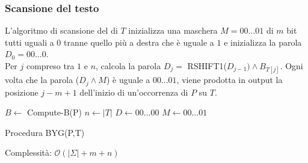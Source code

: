 \subsubsection{Scansione del testo}
L’algoritmo di scansione del di $T$ inizializza una maschera $M = 00 \dots 01$ di $m$ bit tutti uguali a $0$ tranne quello più a destra che è uguale a $1$ e inizializza la parola $D_0 = 00\dots 0$.\\
Per $j$ compreso tra $1$ e $n$, calcola la parola $D_j = $ RSHIFT1($D_{j-1}) \land B_{T[j]}$.
Ogni volta che la parola ($D_j \land M$) è uguale a $00 \dots 01$, viene prodotta in output la posizione $j-m+1$ dell’inizio di un’occorrenza di $P$ su $T$. 


\begin{algorithm}[H]
\SetAlgoLined
    $ B \leftarrow $ Compute-B(P)\;
    $n \leftarrow |T|$\;
    $D \leftarrow 00\dots00$\;
    $M \leftarrow 00\dots01$\;
 \caption{Procedura BYG(P,T)}
\end{algorithm}



Complessità: $\mathcal{O}(|\Sigma| + m + n)$